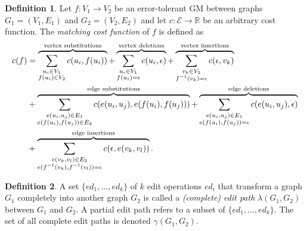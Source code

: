 \documentclass{article}
\theoremstyle{definition}
\newtheorem{definition}{Definition}
\begin{document}
\begin{definition}
  Let $f: V_1 \to V_2$ be an error-tolerant GM between graphs $G_1 = (V_1, E_1)$ and $G_2 = (V_2, E_2)$ and let $c: \mathcal{E} \to \mathbb{R}$ be an arbitrary cost function. The \emph{matching cost function} of $f$ is defined as
  \[
  \begin{aligned}
    c(f) &= \overbrace{\sum_{\substack{u_i \in V_1\\ f(u_i) \in V_2}} c(u_i, f(u_i))}^{\mathclap{\text{vertex substitutions}}} + \overbrace{\sum_{\substack{u_i \in V_1\\ f(u_i) = \epsilon}} c(u_i, \epsilon)}^{\mathclap{\text{vertex deletions}}} + \overbrace{\sum_{\substack{v_k \in V_2\\ f^{-1}(v_k) = \epsilon}} c(\epsilon, v_k)}^{\mathclap{\text{vertex insertions}}} \\
    &+ \overbrace{\sum_{\substack{e(u_i, u_j) \in E_1\\ e(f(u_i), f(u_j)) \in E_2}} c(e(u_i, u_j), e(f(u_i), f(u_j)))}^{\mathclap{\text{edge substitutions}}} + \overbrace{\sum_{\substack{e(u_i, u_j) \in E_1\\ e(f(u_i), f(u_j)) = \epsilon}} c(e(u_i, u_j), \epsilon)}^{\mathclap{\text{edge deletions}}} \\
    &+ \overbrace{\sum_{\substack{e(v_k, v_l) \in E_2\\ e(f^{-1}(v_k), f^{-1}(v_l)) = \epsilon}} c(\epsilon, e(v_k, v_l))}^{\mathclap{\text{edge insertions}}}.
  \end{aligned}
  \]
\end{definition}
\begin{definition}
  A set $\{ ed_1, \dots, ed_k \}$ of $k$ edit operations $ed_i$ that transform a graph $G_1$ completely into another graph $G_2$ is called a \emph{(complete) edit path} $\lambda(G_1, G_2)$ between $G_1$ and $G_2$. A partial edit path refers to a subset of $\{ ed_1, \dots, ed_k \}$. The set of all complete edit paths is denoted $\gamma(G_1, G_2)$.
\end{definition}
\end{document}
